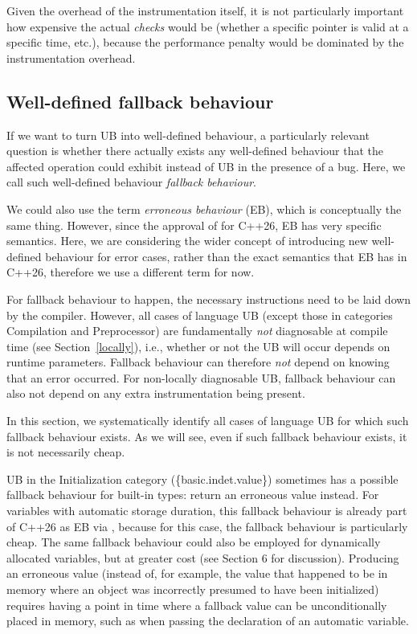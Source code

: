Given the overhead of the instrumentation itself, it is not particularly important how expensive the actual \emph{checks} would be (whether a specific pointer is valid at a specific time, etc.), because the performance penalty would be dominated by the instrumentation overhead. 

\subsection{Well-defined fallback behaviour}
\label{fallback}

If we want to turn UB into well-defined behaviour, a particularly relevant question is whether there actually exists any well-defined behaviour that the affected operation could exhibit instead of UB in the presence of a bug. Here, we call such well-defined behaviour \emph{fallback behaviour}.

We could also use the term \emph{erroneous behaviour} (EB), which is conceptually the same thing. However, since the approval of \cite{P2795R5} for C++26, EB has very specific semantics. Here, we are considering the wider concept of introducing new well-defined behaviour for error cases, rather than the exact semantics that EB has in C++26, therefore we use a different term for now.

For fallback behaviour to happen, the necessary instructions need to be laid down by the compiler. However, all cases of language UB (except those in categories Compilation and Preprocessor) are fundamentally \emph{not} diagnosable at compile time (see Section~\ref{locally}), i.e., whether or not the UB will occur depends on runtime parameters. Fallback behaviour can therefore \emph{not} depend on knowing that an error occurred. For non-locally diagnosable UB, fallback behaviour can also not depend on any extra instrumentation being present.

In this section, we systematically identify all cases of language UB for which such fallback behaviour exists. As we will see, even if such fallback behaviour exists, it is not necessarily cheap.

UB in the Initialization category (\{basic.indet.value\}) sometimes has a possible fallback behaviour for built-in types: return an erroneous value instead. For variables with automatic storage duration, this fallback behaviour is already part of C++26 as EB via \cite{P2795R5}, because for this case, the fallback behaviour is particularly cheap. The same fallback behaviour could also be employed for dynamically allocated variables, but at greater cost (see \cite{P2723R1} Section 6 for discussion).    Producing an erroneous value (instead of, for example, the value that happened to be in memory where an object was incorrectly presumed to have been initialized) requires having a point in time where a fallback value can be unconditionally placed in memory, such as when passing the declaration of an automatic variable.

